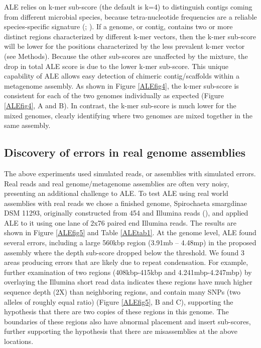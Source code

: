 \documentclass[phd,tocprelim]{cornell}
\begin{document}
ALE relies on k-mer sub-score (the default is k=4) to distinguish contigs coming from different microbial species, because tetra-nucleotide frequencies are a reliable species-specific signature (\cite{Teeling2004}; \cite{Woyke2006}). If a genome, or contig, contains two or more distinct regions characterized by different k-mer vectors, then the k-mer sub-score will be lower for the positions characterized by the less prevalent k-mer vector (see Methods). Because the other sub-scores are unaffected by the mixture, the drop in total ALE score is due to the lower k-mer sub-score. This unique capability of ALE allows easy detection of chimeric contig/scaffolds within a metagenome assembly. As shown in Figure \ref{ALEfig4}, the k-mer sub-score is consistent for each of the two genomes individually as expected (Figure \ref{ALEfig4}, A and B). In contrast, the k-mer sub-score is much lower for the mixed genomes, clearly identifying where two genomes are mixed together in the same assembly.

\subsection{Discovery of errors in real genome assemblies}
The above experiments used simulated reads, or assemblies with simulated errors. Real reads and real genome/metagenome assemblies are often very noisy, presenting an additional challenge to ALE. To test ALE using real world assemblies with real reads we chose a finished genome, Spirochaeta smargdinae DSM 11293, originally constructed from 454 and Illumina reads (\cite{Mavromatis2010}), and applied ALE to it using one lane of 2x76 paired end Illumina reads. The results are shown in Figure \ref{ALEfig5} and Table \ref{ALEtab1}. At the genome level, ALE found several errors, including a large 560kbp region (3.91mb – 4.48mp) in the proposed assembly where the depth sub-score dropped below the threshold. We found 3 areas producing errors that are likely due to repeat condensation. For example, further examination of two regions (408kbp-415kbp and 4.241mbp-4.247mbp) by overlaying the Illumina short read data indicates these regions have much higher sequence depth (2X) than neighboring regions, and contain many SNPs (two alleles of roughly equal ratio) (Figure \ref{ALEfig5}, B and C), supporting the hypothesis that there are two copies of these regions in this genome. The boundaries of these regions also have abnormal placement and insert sub-scores, further supporting the hypothesis that there are misassemblies at the above locations.
\end{document}
